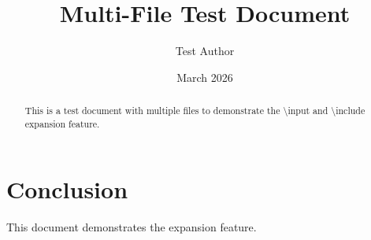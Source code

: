 \documentclass{article}
\title{Multi-File Test Document}
\author{Test Author}
\date{March 2026}
\begin{document}
\maketitle

\begin{abstract}
This is a test document with multiple files to demonstrate the \textbackslash input and \textbackslash include expansion feature.
\end{abstract}





\section{Conclusion}
This document demonstrates the expansion feature.
\end{document}
